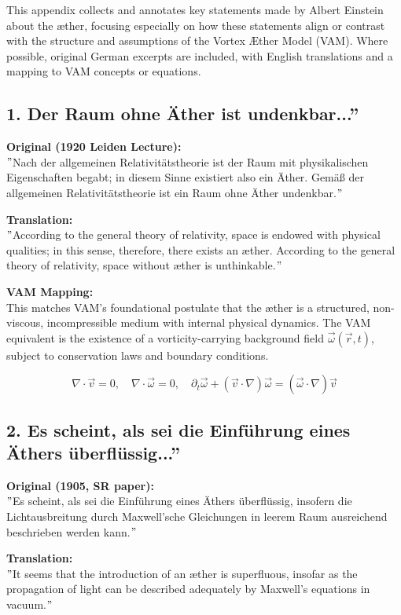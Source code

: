 This appendix collects and annotates key statements made by Albert Einstein about the æther, focusing especially on how these statements align or contrast with the structure and assumptions of the Vortex Æther Model (VAM). Where possible, original German excerpts are included, with English translations and a mapping to VAM concepts or equations.

\subsection*{1. \grqq Der Raum ohne Äther ist undenkbar...\textquotedblright}
\textbf{Original (1920 Leiden Lecture):} \\
\("\)Nach der allgemeinen Relativitätstheorie ist der Raum mit physikalischen Eigenschaften begabt; in diesem Sinne existiert also ein Äther. Gemäß der allgemeinen Relativitätstheorie ist ein Raum ohne Äther undenkbar.\("\)

\textbf{Translation:} \\
\("\)According to the general theory of relativity, space is endowed with physical qualities; in this sense, therefore, there exists an æther. According to the general theory of relativity, space without æther is unthinkable.\("\)

\textbf{VAM Mapping:} \\
This matches VAM's foundational postulate that the æther is a structured, non-viscous, incompressible medium with internal physical dynamics. The VAM equivalent is the existence of a vorticity-carrying background field \( \vec{\omega}(\vec{r}, t) \), subject to conservation laws and boundary conditions.

\[
\nabla \cdot \vec{v} = 0, \quad \nabla \cdot \vec{\omega} = 0, \quad \partial_t \vec{\omega} + (\vec{v} \cdot \nabla) \vec{\omega} = (\vec{\omega} \cdot \nabla) \vec{v}
\]

\subsection*{2. \grqq Es scheint, als sei die Einführung eines Äthers überflüssig...\textquotedblright}
\textbf{Original (1905, SR paper):} \\
\("\)Es scheint, als sei die Einführung eines Äthers überflüssig, insofern die Lichtausbreitung durch Maxwell'sche Gleichungen in leerem Raum ausreichend beschrieben werden kann.\("\)

\textbf{Translation:} \\
\("\)It seems that the introduction of an æther is superfluous, insofar as the propagation of light can be described adequately by Maxwell's equations in vacuum.\("\)

